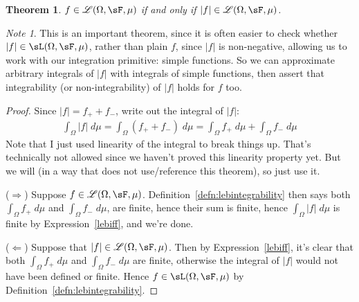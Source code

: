\documentclass[12pt]{article}
\theoremstyle{plain}
\newtheorem{thm}{Theorem}[section]
\theoremstyle{definition}
\theoremstyle{remark}
\newtheorem*{note}{Note}
\begin{document}
\begin{thm}
\label{thm:fintiff}
$f\in\mathscr{L}(\Omega,\sF,\mu)$ if and only if
$|f|\in\mathscr{L}(\Omega,\sF,\mu)$.
\end{thm}
\begin{note}
This is an important theorem, since it is often easier to check whether
$|f|\in\sL(\Omega,\sF,\mu)$, rather than plain $f$, since $|f|$ is
non-negative, allowing us to work with our integration primitive: simple
functions. So we can approximate arbitrary integrals of $|f|$ with
integrals of simple functions, then assert that integrability (or
non-integrability) of $|f|$ holds for $f$ too.
\end{note}
\begin{proof}
Since $|f|=f_+ + f_-$, write out the integral of $|f|$:
\begin{align}
  \int_\Omega |f|\; d\mu
  = \int_\Omega (f_+ + f_-) \; d\mu
  = \int_\Omega f_+ \; d\mu + \int_\Omega  f_- \; d\mu
  \label{lebiff}
\end{align}
Note that I just used linearity of the integral to break things up.
That's technically not allowed since we haven't proved this linearity
property yet. But we will (in a way that does not use/reference this
theorem), so just use it.

($\Rightarrow$) Suppose $f\in\mathscr{L}(\Omega,\sF,\mu)$.
Definition~\ref{defn:lebintegrability} then
says both $\int_\Omega f_+ \; d\mu$ and $\int_\Omega  f_- \; d\mu$,
are finite, hence their sum is finite,
hence $\int_\Omega |f|\;d\mu$ is finite by Expression~\ref{lebiff}, and
we're done.

($\Leftarrow$) Suppose that $|f|\in\mathscr{L}(\Omega,\sF,\mu)$. Then by
Expression~\ref{lebiff}, it's clear that both $\int_\Omega f_+ \; d\mu$
and $\int_\Omega  f_- \; d\mu$ are finite, otherwise the integral of
$|f|$ would not have been defined or finite. Hence
$f\in\sL(\Omega,\sF,\mu)$ by Definition~\ref{defn:lebintegrability}.
\end{proof}
\end{document}
